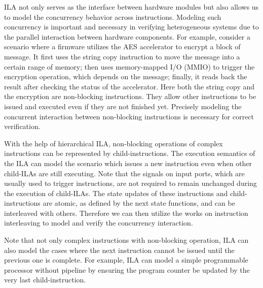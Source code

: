 
ILA not only serves as the interface between hardware modules but 
also allows us to model the concurrency behavior across instructions. 
Modeling such concurrency is important and necessary in verifying heterogeneous 
systems due to the parallel interaction between hardware components.
%
For example, consider a scenario where a firmware utilizes the AES accelerator
to encrypt a block of message. 
It first uses the string copy instruction to move the message into a certain
range of memory; then uses memory-mapped I/O (MMIO) to trigger the encryption
operation, which depends on the message; finally, it reads back the result after
checking the status of the accelerator.
%
Here both the string copy and the encryption are non-blocking instructions. 
They allow other instructions to be issued and executed even if they are not
finished yet.
Precisely modeling the concurrent interaction between non-blocking instructions 
is necessary for correct verification.

With the help of hierarchical ILA, non-blocking operations of complex 
instructions can be represented by child-instructions.
The execution semantics of the ILA can model the scenario which issues a new
instruction even when other child-ILAs are still executing.
%
Note that the signals on input ports, which are usually used to trigger 
instructions, are not required to remain unchanged during the execution of 
child-ILAs.
The state updates of these instructions and child-instructions are atomic, as 
defined by the next state functions, and can be interleaved with others.
%
Therefore we can then utilize the works on instruction interleaving to model
and verify the concurrency interaction.

\iffalse
Note that not only complex instructions with non-blocking operation, ILA can 
also model the cases where the next instruction cannot be issued until the 
previous one is complete. 
For example, ILA can model a simple programmable processor without pipeline by
ensuring the program counter be updated by the very last child-instruction.

